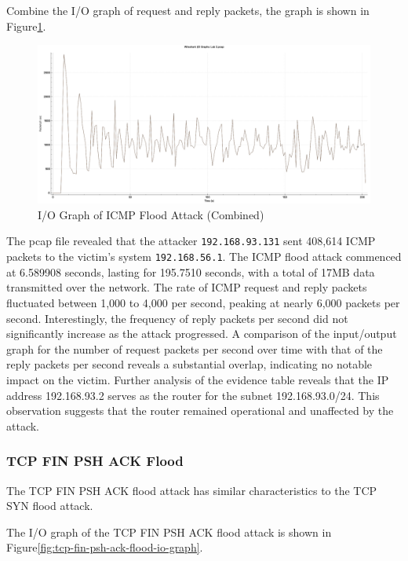 \documentclass{article}
\begin{document}
    Combine the I/O graph of request and reply packets, the graph is shown in Figure\ref{fig:icmp-flood-io-graph-combine}.

    \begin{figure}[H]
        \centering
        \includegraphics[width=\textwidth]{image/131_56_icmp.png}
        \caption{I/O Graph of ICMP Flood Attack (Combined)}
        \label{fig:icmp-flood-io-graph-combine}
    \end{figure}

    The pcap file revealed that the attacker \lstinline|192.168.93.131| sent 408,614 ICMP packets to the victim's system \lstinline|192.168.56.1|.
    The ICMP flood attack commenced at 6.589908 seconds, lasting for 195.7510 seconds, with a total of 17MB data transmitted over the network. 
    The rate of ICMP request and reply packets fluctuated between 1,000 to 4,000 per second, peaking at nearly 6,000 packets per second. 
    Interestingly, the frequency of reply packets per second did not significantly increase as the attack progressed. 
    A comparison of the input/output graph for the number of request packets per second over time with that of the reply packets per second reveals a substantial overlap, indicating no notable impact on the victim.
    Further analysis of the evidence table reveals that the IP address 192.168.93.2 serves as the router for the subnet 192.168.93.0/24. 
    This observation suggests that the router remained operational and unaffected by the attack.

    \subsubsection{TCP FIN PSH ACK Flood}\label{subsubsec:tcp-fin-psh-ack-flood}
    The TCP FIN PSH ACK flood attack has similar characteristics to the TCP SYN flood attack. 

    The I/O graph of the TCP FIN PSH ACK flood attack is shown in Figure\ref{fig:tcp-fin-psh-ack-flood-io-graph}.
\end{document}
